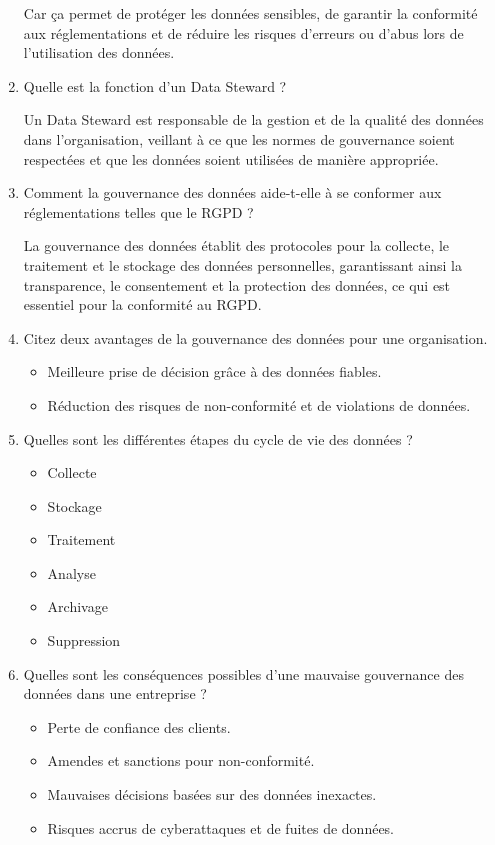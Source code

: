 \begin{enumerate}
        Car ça permet de protéger les données sensibles, de garantir la conformité aux réglementations et de réduire les risques d'erreurs ou d'abus lors de l'utilisation des données.
    \item Quelle est la fonction d'un Data Steward ?

        Un Data Steward est responsable de la gestion et de la qualité des données dans l'organisation, veillant à ce que les normes de gouvernance soient respectées et que les données soient utilisées de manière appropriée.
    \item Comment la gouvernance des données aide-t-elle à se conformer aux réglementations telles que le RGPD ?

        La gouvernance des données établit des protocoles pour la collecte, le traitement et le stockage des données personnelles, garantissant ainsi la transparence, le consentement et la protection des données, ce qui est essentiel pour la conformité au RGPD.
    \item Citez deux avantages de la gouvernance des données pour une organisation.

        \begin{itemize}
            \item Meilleure prise de décision grâce à des données fiables.
            \item Réduction des risques de non-conformité et de violations de données.
        \end{itemize}
    \item Quelles sont les différentes étapes du cycle de vie des données ?

        \begin{itemize}
            \item Collecte
            \item Stockage
            \item Traitement
            \item Analyse
            \item Archivage
            \item Suppression
        \end{itemize}
    \item Quelles sont les conséquences possibles d'une mauvaise gouvernance des données dans une entreprise ?

        \begin{itemize}
            \item Perte de confiance des clients.
            \item Amendes et sanctions pour non-conformité.
            \item Mauvaises décisions basées sur des données inexactes.
            \item Risques accrus de cyberattaques et de fuites de données.
        \end{itemize}
\end{enumerate}

